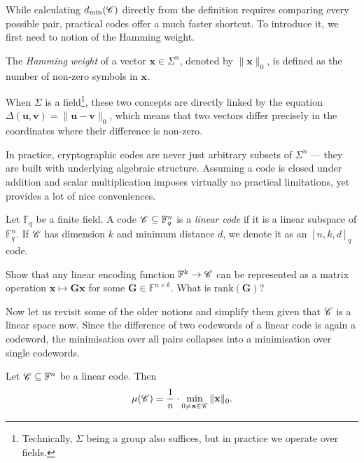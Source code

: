 \documentclass[../../book]{subfiles}
\begin{document}
While calculating $d_{\min}(\mathscr{C})$ directly from the definition requires comparing every possible pair, practical codes offer a much faster shortcut. To introduce it, we first need to notion of the Hamming weight.

\begin{definition}\label{def:hamming-weight}
  The \emph{Hamming weight} of a vector $\mathbf{x} \in \Sigma^n$, denoted by $\|\mathbf{x}\|_0$, is defined as the number of non-zero symbols in $\mathbf{x}$.
\end{definition}

When $\Sigma$ is a field\footnote{Technically, $\Sigma$ being a group also suffices, but in practice we operate over fields.}, these two concepts are directly linked by the equation $\Delta(\mathbf{u}, \mathbf{v}) = \|\mathbf{u} - \mathbf{v}\|_0$, which means that two vectors differ precisely in the coordinates where their difference is non-zero. 

In practice, cryptographic codes are never just arbitrary subsets of $\Sigma^n$ --- they are built with underlying algebraic structure. Assuming a code is closed under addition and scalar multiplication imposes virtually no practical limitations, yet provides a lot of nice conveniences.

\begin{definition}\label{def:linear-code}
  Let $\mathbb{F}_q$ be a finite field. A code $\mathscr{C} \subseteq \mathbb{F}_q^n$ is a \emph{linear code} if it is a linear subspace of $\mathbb{F}_q^n$. If $\mathscr{C}$ has dimension $k$ and minimum distance $d$, we denote it as an $[n,k,d]_q$ code.
\end{definition}

\begin{exercise}
  Show that any linear encoding function $\mathbb{F}^k \to \mathscr{C}$ can be represented as a matrix operation $\mathbf{x} \mapsto \mathbf{G}\mathbf{x}$ for some $\mathbf{G} \in \mathbb{F}^{n \times k}$.
  What is $\text{rank}(\mathbf{G})$?
\end{exercise}

Now let us revisit some of the older notions and simplify them given that $\mathscr{C}$ is a linear space now. 
Since the difference of two codewords of a linear code is again a codeword, the minimisation over all pairs collapses into a minimisation over single codewords.

\begin{proposition}\label{prop:dist-eq-weight}
  Let $\mathscr{C} \subseteq \mathbb{F}^n$ be a linear code. Then
  \begin{equation*}
    \mu(\mathscr{C}) = \frac{1}{n}\cdot \min_{0 \neq \mathbf{x} \in \mathscr{C}} \|\mathbf{x}\|_0.
  \end{equation*}
\end{proposition}
\end{document}
